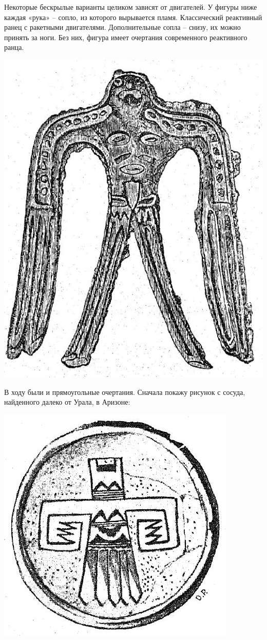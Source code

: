 Некоторые бескрылые варианты целиком зависят от двигателей. У фигуры ниже каждая «рука» – сопло, из которого вырывается пламя. Классический реактивный ранец с ракетными двигателями. Дополнительные сопла – снизу, их можно принять за ноги. Без них, фигура имеет очертания современного реактивного ранца.
\vspace*{\fill}
\begin{center}
\includegraphics[width=\linewidth]{chast-zmiy/ktotakiezmei/ural-bogi-01.jpg}
\end{center}
\vspace*{\fill}
\newpage

В ходу были и прямоугольные очертания. Сначала покажу рисунок с сосуда, найденного далеко от Урала, в Аризоне:
\vspace*{\fill}
\begin{center}
\includegraphics[width=0.65\linewidth]{chast-zmiy/ktotakiezmei/ural-bogi-19.jpg}
\end{center}

